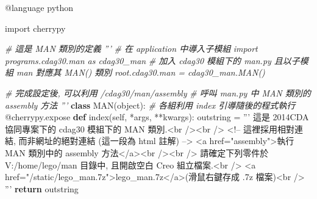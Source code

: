 \documentclass[]{article}
\newenvironment{Shaded}{}{}
\newcommand{\KeywordTok}[1]{\textcolor[rgb]{0.00,0.44,0.13}{\textbf{{#1}}}}
\newcommand{\DataTypeTok}[1]{\textcolor[rgb]{0.56,0.13,0.00}{{#1}}}
\newcommand{\CharTok}[1]{\textcolor[rgb]{0.25,0.44,0.63}{{#1}}}
\newcommand{\StringTok}[1]{\textcolor[rgb]{0.25,0.44,0.63}{{#1}}}
\newcommand{\CommentTok}[1]{\textcolor[rgb]{0.38,0.63,0.69}{\textit{{#1}}}}
\newcommand{\OtherTok}[1]{\textcolor[rgb]{0.00,0.44,0.13}{{#1}}}
\newcommand{\NormalTok}[1]{{#1}}
\begin{document}
\begin{Shaded}
\begin{Highlighting}[]
\OtherTok{@language} \NormalTok{python}

\CharTok{import} \NormalTok{cherrypy}

\CommentTok{# 這是 MAN 類別的定義}
\CommentTok{'''}
\CommentTok{# 在 application 中導入子模組}
\CommentTok{import programs.cdag30.man as cdag30_man}
\CommentTok{# 加入 cdag30 模組下的 man.py 且以子模組 man 對應其 MAN() 類別}
\CommentTok{root.cdag30.man = cdag30_man.MAN()}

\CommentTok{# 完成設定後, 可以利用}
\CommentTok{/cdag30/man/assembly}
\CommentTok{# 呼叫 man.py 中 MAN 類別的 assembly 方法}
\CommentTok{'''}
\KeywordTok{class} \NormalTok{MAN(}\DataTypeTok{object}\NormalTok{):}
    \CommentTok{# 各組利用 index 引導隨後的程式執行}
    \OtherTok{@cherrypy.expose}
    \KeywordTok{def} \NormalTok{index(}\OtherTok{self}\NormalTok{, *args, **kwargs):}
        \NormalTok{outstring = }\StringTok{'''}
\StringTok{這是 2014CDA 協同專案下的 cdag30 模組下的 MAN 類別.<br /><br />}
\StringTok{<!-- 這裡採用相對連結, 而非網址的絕對連結 (這一段為 html 註解) -->}
\StringTok{<a href="assembly">執行  MAN 類別中的 assembly 方法</a><br /><br />}
\StringTok{請確定下列零件於 V:/home/lego/man 目錄中, 且開啟空白 Creo 組立檔案.<br />}
\StringTok{<a href="/static/lego_man.7z">lego_man.7z</a>(滑鼠右鍵存成 .7z 檔案)<br />}
\StringTok{'''}
        \KeywordTok{return} \NormalTok{outstring}


\end{Highlighting}
\end{Shaded}
\end{document}
